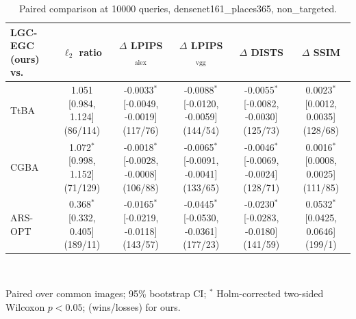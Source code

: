 \begin{table}[t]
\centering\footnotesize
\caption{Paired comparison at 10000 queries, densenet161\_places365, non\_targeted.}
\begin{tabular}{lccccc}
\toprule
LGC-EGC (ours) vs. & $\ell_2$ ratio & $\Delta$ LPIPS$_{\mathrm{alex}}$ & $\Delta$ LPIPS$_{\mathrm{vgg}}$ & $\Delta$ DISTS & $\Delta$ SSIM \\
\midrule
TtBA & 1.051 [0.984, 1.124] (86/114) & -0.0033$^{*}$ [-0.0049, -0.0019] (117/76) & -0.0088$^{*}$ [-0.0120, -0.0059] (144/54) & -0.0055$^{*}$ [-0.0082, -0.0030] (125/73) & 0.0023$^{*}$ [0.0012, 0.0035] (128/68) \\
CGBA & 1.072$^{*}$ [0.998, 1.152] (71/129) & -0.0018$^{*}$ [-0.0028, -0.0008] (106/88) & -0.0065$^{*}$ [-0.0091, -0.0041] (133/65) & -0.0046$^{*}$ [-0.0069, -0.0024] (128/71) & 0.0016$^{*}$ [0.0008, 0.0025] (111/85) \\
ARS-OPT & 0.368$^{*}$ [0.332, 0.405] (189/11) & -0.0165$^{*}$ [-0.0219, -0.0118] (143/57) & -0.0445$^{*}$ [-0.0530, -0.0361] (177/23) & -0.0230$^{*}$ [-0.0283, -0.0180] (141/59) & 0.0532$^{*}$ [0.0425, 0.0646] (199/1) \\
\bottomrule
\end{tabular}
\\[2pt]\parbox{\linewidth}{\scriptsize Paired over common images; 95\% bootstrap CI; $^{*}$ Holm-corrected two-sided Wilcoxon $p<0.05$; (wins/losses) for ours.}
\end{table}
